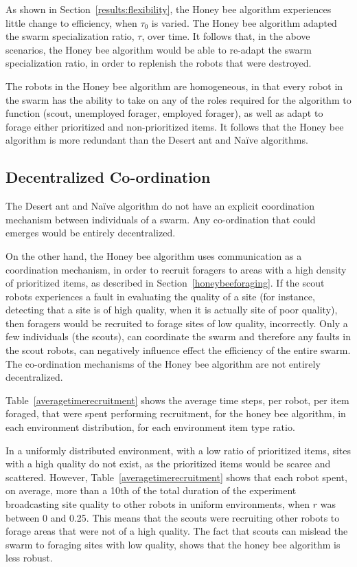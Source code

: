 As shown in Section~\ref{results:flexibility}, the Honey bee algorithm experiences little change to efficiency, when $\tau_0$ is varied. The Honey bee algorithm adapted the swarm specialization ratio, $\tau$, over time. It follows that, in the above scenarios, the Honey bee algorithm would be able to re-adapt the swarm specialization ratio, in order to replenish the robots that were destroyed. 

The robots in the Honey bee algorithm are homogeneous, in that every robot in the swarm has the ability to take on any of the roles required for the algorithm to function (scout, unemployed forager, employed forager), as well as adapt to forage either prioritized and non-prioritized items. It follows that the Honey bee algorithm is more redundant than the Desert ant and Na\"ive algorithms.

\subsection{Decentralized Co-ordination}
\label{results:decentralizedcoordination}


The Desert ant and Na\"ive algorithm do not have an explicit coordination mechanism between individuals of a swarm. Any co-ordination that could emerges would be entirely decentralized. 

On the other hand, the Honey bee algorithm uses communication as a coordination mechanism, in order to recruit foragers to areas with a high density of prioritized items, as described in Section~\ref{honeybeeforaging}. If the scout robots experiences a fault in evaluating the quality of a site (for instance, detecting that a site is of high quality, when it is actually site of poor quality), then foragers would be recruited to forage sites of low quality, incorrectly. Only a few individuals (the scouts), can coordinate the swarm and therefore any faults in the scout robots, can negatively influence effect the efficiency of the entire swarm. The co-ordination mechanisms of the Honey bee algorithm are not entirely decentralized.

Table~\ref{averagetimerecruitment} shows the average time steps, per robot, per item foraged, that were spent performing recruitment, for the honey bee algorithm, in each environment distribution, for each environment item type ratio. 

In a uniformly distributed environment, with a low ratio of prioritized items, sites with a high quality do not exist, as the prioritized items would be scarce and scattered. However, Table~\ref{averagetimerecruitment} shows that each robot spent, on average, more than a 10th of the total duration of the experiment broadcasting site quality to other robots in uniform environments, when $r$ was between 0 and 0.25. This means that the scouts were recruiting other robots to forage areas that were not of a high quality. The fact that scouts can mislead the swarm to foraging sites with low quality, shows that the honey bee algorithm is less robust.

